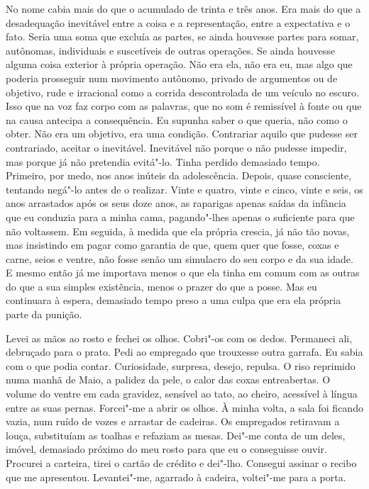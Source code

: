 No nome cabia mais do que o acumulado de trinta e três anos. Era mais do
que a desadequação inevitável entre a coisa e a representação, entre a
expectativa e o fato. Seria uma soma que excluía as partes, se ainda
houvesse partes para somar, autônomas, individuais e suscetíveis de
outras operações. Se ainda houvesse alguma coisa exterior à própria
operação. Não era ela, não era eu, mas algo que poderia prosseguir num
movimento autônomo, privado de argumentos ou de objetivo, rude e
irracional como a corrida descontrolada de um veículo no escuro. Isso
que na voz faz corpo com as palavras, que no som é remissível à fonte ou
que na causa antecipa a consequência. Eu supunha saber o que queria, não
como o obter. Não era um objetivo, era uma condição. Contrariar aquilo
que pudesse ser contrariado, aceitar o inevitável. Inevitável não porque
o não pudesse impedir, mas porque já não pretendia evitá"-lo. Tinha
perdido demasiado tempo. Primeiro, por medo, nos anos inúteis da
adolescência. Depois, quase consciente, tentando negá"-lo antes de o
realizar. Vinte e quatro, vinte e cinco, vinte e seis, os anos
arrastados após os seus doze anos, as raparigas apenas saídas da
infância que eu conduzia para a minha cama, pagando"-lhes apenas o
suficiente para que não voltassem. Em seguida, à medida que ela própria
crescia, já não tão novas, mas insistindo em pagar como garantia de que,
quem quer que fosse, coxas e carne, seios e ventre, não fosse senão um
simulacro do seu corpo e da sua idade. E mesmo então já me importava
menos o que ela tinha em comum com as outras do que a sua simples
existência, menos o prazer do que a posse. Mas eu continuara à espera,
demasiado tempo preso a uma culpa que era ela própria parte da punição.

Levei as mãos ao rosto e fechei os olhos. Cobri"-os com os dedos.
Permaneci ali, debruçado para o prato. Pedi ao empregado que trouxesse
outra garrafa. Eu sabia com o que podia contar. Curiosidade, surpresa,
desejo, repulsa. O riso reprimido numa manhã de Maio, a palidez da pele,
o calor das coxas entreabertas. O volume do ventre em cada gravidez,
sensível ao tato, ao cheiro, acessível à língua entre as suas pernas.
Forcei"-me a abrir os olhos. À minha volta, a sala foi ficando vazia,
num ruído de vozes e arrastar de cadeiras. Os empregados retiravam a
louça, substituíam as toalhas e refaziam as mesas. Dei"-me conta de um
deles, imóvel, demasiado próximo do meu rosto para que eu o conseguisse
ouvir. Procurei a carteira, tirei o cartão de crédito e dei"-lho.
Consegui assinar o recibo que me apresentou. Levantei"-me, agarrado à
cadeira, voltei"-me para a porta.

